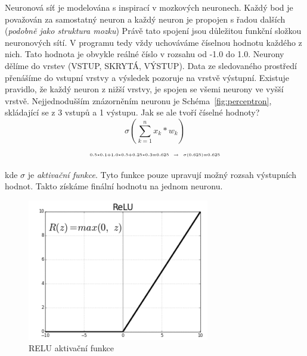 \documentclass[a4paper,12pt]{article}
\begin{document}
        Neuronová síť je modelována s inspirací v mozkových neuronech. Každý bod je považován za
        samostatný neuron a každý neuron je propojen s řadou dalších (\textit{podobně jako struktura mozku})
        Právě tato spojení jsou důležitou funkční složkou neuronových sítí. V programu tedy vždy 
        uchováváme číselnou hodnotu každého z nich. Tato hodnota je obvykle reálné číslo v rozsahu od -1.0 do 1.0.
        Neurony dělíme do vrstev (VSTUP, SKRYTÁ, VÝSTUP). Data ze sledovaného prostředí přenášíme
        do vstupní vrstvy a výsledek pozoruje na vrstvě výstupní. Existuje pravidlo, že každý neuron z nižší vrstvy,
        je spojen se všemi neurony ve vyšší vrstvě. Nejjednodušším znázorněním neuronu je 
        Schéma~\ref{fig:perceptron}, skládající se z 3 vstupů a 1 výstupu.
        Jak se ale tvoří číselné hodnoty?
        \vspace{-0.05em}
        \begin{equation}
            \sigma(\displaystyle\sum_{k=1}^{n}{x_k * w_k})
        \end{equation}
        \vspace{-0.2cm}
        \begin{equation}
            \scriptscriptstyle 0.5*0.1 + 1.0*0.5 + 0.25*0.3 = 0.625 \hspace*{0.2cm} \rightarrow \hspace*{0.2cm}
            \sigma(0.625)=0.625
        \end{equation}

        kde $\scriptstyle \sigma$ je \textit{aktivační funkce}. Tyto funkce pouze upravují 
        možný rozsah výstupních hodnot. Takto získáme finální hodnotu na jednom neuronu.\\

        \begin{figure}
            \vspace{-2.5em}
            \centering
            \includegraphics[width=0.8\linewidth]{data/relu.png}
            \caption{RELU aktivační funkce \cite{c:relu}} 
            \label{fig:relu}
        \end{figure}
\end{document}

